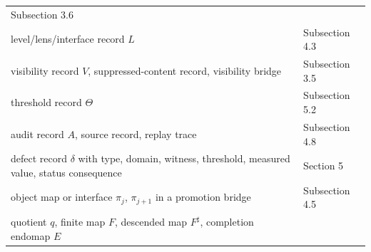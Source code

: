 \documentclass[11pt]{article}
\theoremstyle{definition}
\begin{document}
\begin{longtable}[]{@{}ll@{}}
\begin{minipage}[t]{0.47\columnwidth}
Subsection 3.6\strut
\end{minipage}\tabularnewline
\begin{minipage}[t]{0.47\columnwidth}\raggedright
level/lens/interface record \(L\)\strut
\end{minipage} & \begin{minipage}[t]{0.47\columnwidth}\raggedright
Subsection 4.3\strut
\end{minipage}\tabularnewline
\begin{minipage}[t]{0.47\columnwidth}\raggedright
visibility record \(V\), suppressed-content record, visibility bridge\strut
\end{minipage} & \begin{minipage}[t]{0.47\columnwidth}\raggedright
Subsection 3.5\strut
\end{minipage}\tabularnewline
\begin{minipage}[t]{0.47\columnwidth}\raggedright
threshold record \(\Theta\)\strut
\end{minipage} & \begin{minipage}[t]{0.47\columnwidth}\raggedright
Subsection 5.2\strut
\end{minipage}\tabularnewline
\begin{minipage}[t]{0.47\columnwidth}\raggedright
audit record \(A\), source record, replay trace\strut
\end{minipage} & \begin{minipage}[t]{0.47\columnwidth}\raggedright
Subsection 4.8\strut
\end{minipage}\tabularnewline
\begin{minipage}[t]{0.47\columnwidth}\raggedright
defect record \(\delta\) with type, domain, witness, threshold, measured value, status consequence\strut
\end{minipage} & \begin{minipage}[t]{0.47\columnwidth}\raggedright
Section 5\strut
\end{minipage}\tabularnewline
\begin{minipage}[t]{0.47\columnwidth}\raggedright
object map or interface \(\pi_j\), \(\pi_{j+1}\) in a promotion bridge\strut
\end{minipage} & \begin{minipage}[t]{0.47\columnwidth}\raggedright
Subsection 4.5\strut
\end{minipage}\tabularnewline
\begin{minipage}[t]{0.47\columnwidth}\raggedright
quotient \(q\), finite map \(F\), descended map \(F^\sharp\), completion endomap \(E\)\strut

\end{minipage}
\end{longtable}
\end{document}
